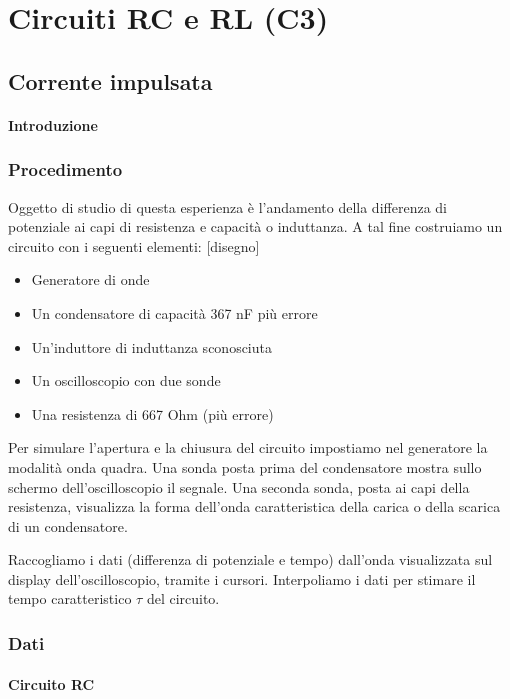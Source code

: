 \chapter{Circuiti RC e RL (C3)}

\section{Corrente impulsata}
\subsubsection{Introduzione}

\subsection{Procedimento}

Oggetto di studio di questa esperienza è l'andamento della differenza di potenziale ai capi di resistenza e capacità o induttanza.
A tal fine costruiamo un circuito con i seguenti elementi:
[disegno]

\begin{itemize}
  \item Generatore di onde
  \item Un condensatore di capacità 367 nF più errore
  \item Un'induttore di induttanza sconosciuta
  \item Un oscilloscopio con due sonde
  \item Una resistenza di 667 Ohm (più errore)
\end{itemize}

Per simulare l'apertura e la chiusura del circuito impostiamo nel generatore la modalità onda quadra. Una sonda posta prima del condensatore mostra sullo schermo dell'oscilloscopio il segnale.  
Una seconda sonda, posta ai capi della resistenza, visualizza la forma dell'onda caratteristica della carica o della scarica di un condensatore.

Raccogliamo i dati (differenza di potenziale e tempo) dall'onda visualizzata sul display dell'oscilloscopio, tramite i cursori. Interpoliamo i dati per stimare il tempo caratteristico $\tau$ del circuito.

\subsection{Dati}
\subsubsection{Circuito RC}

